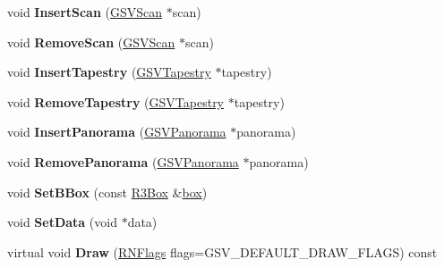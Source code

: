 \begin{DoxyCompactItemize}
\item 
void {\bfseries Insert\+Scan} (\hyperlink{class_g_s_v_scan}{G\+S\+V\+Scan} $\ast$scan)\hypertarget{class_g_s_v_segment_a2f2f56f1f932d5c8aa0adf6a5727c759}{}\label{class_g_s_v_segment_a2f2f56f1f932d5c8aa0adf6a5727c759}

\item 
void {\bfseries Remove\+Scan} (\hyperlink{class_g_s_v_scan}{G\+S\+V\+Scan} $\ast$scan)\hypertarget{class_g_s_v_segment_a83121921a568396095da51dda3fe1ac3}{}\label{class_g_s_v_segment_a83121921a568396095da51dda3fe1ac3}

\item 
void {\bfseries Insert\+Tapestry} (\hyperlink{class_g_s_v_tapestry}{G\+S\+V\+Tapestry} $\ast$tapestry)\hypertarget{class_g_s_v_segment_a1069360ac8e7516ec9cbda6dc3ef6801}{}\label{class_g_s_v_segment_a1069360ac8e7516ec9cbda6dc3ef6801}

\item 
void {\bfseries Remove\+Tapestry} (\hyperlink{class_g_s_v_tapestry}{G\+S\+V\+Tapestry} $\ast$tapestry)\hypertarget{class_g_s_v_segment_a4e4d64ce00e086bdec9d572735fbeaf8}{}\label{class_g_s_v_segment_a4e4d64ce00e086bdec9d572735fbeaf8}

\item 
void {\bfseries Insert\+Panorama} (\hyperlink{class_g_s_v_panorama}{G\+S\+V\+Panorama} $\ast$panorama)\hypertarget{class_g_s_v_segment_a4601647b2bd35689b9a716156462423c}{}\label{class_g_s_v_segment_a4601647b2bd35689b9a716156462423c}

\item 
void {\bfseries Remove\+Panorama} (\hyperlink{class_g_s_v_panorama}{G\+S\+V\+Panorama} $\ast$panorama)\hypertarget{class_g_s_v_segment_ac41ed16389a57327e22bc1a6ae0acd42}{}\label{class_g_s_v_segment_ac41ed16389a57327e22bc1a6ae0acd42}

\item 
void {\bfseries Set\+B\+Box} (const \hyperlink{class_r3_box}{R3\+Box} \&\hyperlink{structbox}{box})\hypertarget{class_g_s_v_segment_aafcf4ed5049eb53e54d4a057101523af}{}\label{class_g_s_v_segment_aafcf4ed5049eb53e54d4a057101523af}

\item 
void {\bfseries Set\+Data} (void $\ast$data)\hypertarget{class_g_s_v_segment_a1d6ca09a1dcf2341e83918121b34ea00}{}\label{class_g_s_v_segment_a1d6ca09a1dcf2341e83918121b34ea00}

\item 
virtual void {\bfseries Draw} (\hyperlink{class_r_n_flags}{R\+N\+Flags} flags=G\+S\+V\+\_\+\+D\+E\+F\+A\+U\+L\+T\+\_\+\+D\+R\+A\+W\+\_\+\+F\+L\+A\+GS) const \hypertarget{class_g_s_v_segment_a8b8fdcc8f47b89cc4b5bcfbed62f0361}{}\label{class_g_s_v_segment_a8b8fdcc8f47b89cc4b5bcfbed62f0361}


\end{DoxyCompactItemize}

